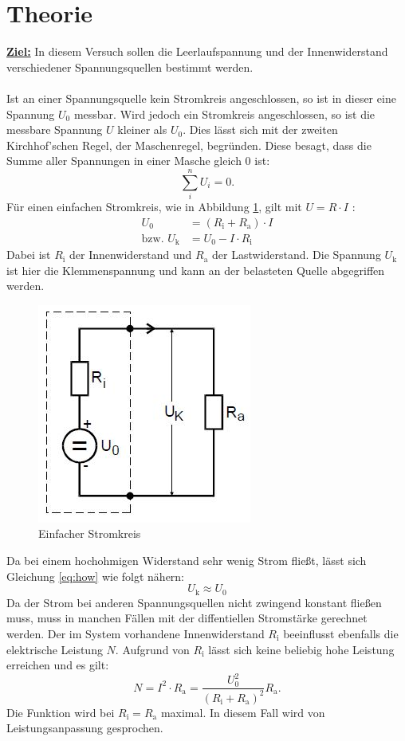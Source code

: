 \section{Theorie}

\textbf{\underline{Ziel:}}
In diesem Versuch sollen die Leerlaufspannung und der Innenwiderstand verschiedener Spannungsquellen bestimmt werden.
\\
\\
Ist an einer Spannungsquelle kein Stromkreis angeschlossen, so ist in dieser eine Spannung $U_\text{0}$ messbar.
Wird jedoch ein Stromkreis angeschlossen, so ist die messbare Spannung $U$ kleiner als $U_\text{0}$.
Dies lässt sich mit der zweiten Kirchhof'schen Regel, der Maschenregel, begründen.
Diese besagt, dass die Summe aller Spannungen in einer Masche gleich $0$ ist:
\begin{equation}
\sum\limits_{i}^{n}U_i=0  .
\end{equation}
Für einen einfachen Stromkreis, wie in Abbildung \ref{fig:esk}, gilt mit $U=R\cdot I$ :
\begin{align}
  U_\text{0}&=\left(R_\text{i}+R_\text{a}\right) \cdot I \\
  \text{bzw.}\,\, U_\text{k}&=U_\text{0}-I\cdot R_\text{i} \label{eq:how}
\end{align}
Dabei ist $R_\text{i}$ der Innenwiderstand und $R_\text{a}$ der Lastwiderstand.
Die Spannung $U_\text{k}$ ist hier die Klemmenspannung und kann an der belasteten Quelle abgegriffen werden.
\begin{figure}[H]
  \centering
  \includegraphics{text/Bilder/esk.jpg}
  \caption{Einfacher Stromkreis \cite[213]{sample}}
  \label{fig:esk}
\end{figure}
Da bei einem hochohmigen Widerstand sehr wenig Strom fließt, lässt sich Gleichung \eqref{eq:how} wie folgt nähern:
\begin{equation}
  U_\text{k} \approx U_\text{0}
\end{equation}
Da der Strom bei anderen Spannungsquellen nicht zwingend konstant fließen muss, muss in manchen Fällen mit
der diffentiellen Stromstärke gerechnet werden.
Der im System vorhandene Innenwiderstand $R_\text{i}$ beeinflusst ebenfalls die elektrische Leistung $N$.
Aufgrund von $R_\text{i}$ lässt sich keine beliebig hohe Leistung erreichen und es gilt:
\begin{equation}
  N=I^2 \cdot R_\text{a}=\frac{U^2_\text{0}}{(R_\text{i}+R_\text{a})^2}R_\text{a} .
  \label{eqn:leistung}
\end{equation}
Die Funktion wird bei $R_\text{i}=R_\text{a}$ maximal. In diesem Fall wird von Leistungsanpassung gesprochen.
